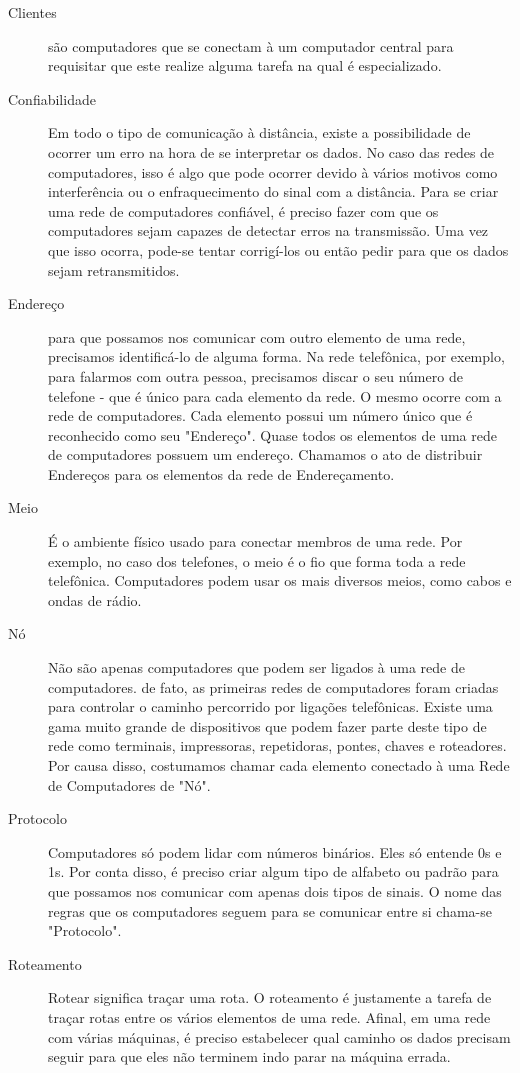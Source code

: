 	\begin{description}
		\item[Clientes] são computadores que se conectam à um computador central para requisitar que este realize alguma tarefa na qual é especializado.
		\item[Confiabilidade] Em todo o tipo de comunicação à distância, existe a possibilidade de ocorrer um erro na hora de se interpretar os dados. No caso das redes de computadores, isso é algo que pode ocorrer devido à vários motivos como interferência ou o enfraquecimento do sinal com a distância. Para se criar uma rede de computadores confiável, é preciso fazer com que os computadores sejam capazes de detectar erros na transmissão. Uma vez que isso ocorra, pode-se tentar corrigí-los ou então pedir para que os dados sejam retransmitidos.
		\item[Endereço] para que possamos nos comunicar com outro elemento de uma rede, precisamos identificá-lo de alguma forma. Na rede telefônica, por exemplo, para falarmos com outra pessoa, precisamos discar o seu número de telefone - que é único para cada elemento da rede. O mesmo ocorre com a rede de computadores. Cada elemento possui um número único que é reconhecido como seu "Endereço". Quase todos os elementos de uma rede de computadores possuem um endereço. Chamamos o ato de distribuir Endereços para os elementos da rede de Endereçamento.
		\item[Meio] É o ambiente físico usado para conectar membros de uma rede. Por exemplo, no caso dos telefones, o meio é o fio que forma toda a rede telefônica. Computadores podem usar os mais diversos meios, como cabos e ondas de rádio.
		\item[Nó] Não são apenas computadores que podem ser ligados à uma rede de computadores. de fato, as primeiras redes de computadores foram criadas para controlar o caminho percorrido por ligações telefônicas. Existe uma gama muito grande de dispositivos que podem fazer parte deste tipo de rede como terminais, impressoras, repetidoras, pontes, chaves e roteadores. Por causa disso, costumamos chamar cada elemento conectado à uma Rede de Computadores de "Nó".
		\item[Protocolo] Computadores só podem lidar com números binários. Eles só entende 0s e 1s. Por conta disso, é preciso criar algum tipo de alfabeto ou padrão para que possamos nos comunicar com apenas dois tipos de sinais. O nome das regras que os computadores seguem para se comunicar entre si chama-se "Protocolo".
		\item[Roteamento] Rotear significa traçar uma rota. O roteamento é justamente a tarefa de traçar rotas entre os vários elementos de uma rede. Afinal, em uma rede com várias máquinas, é preciso estabelecer qual caminho os dados precisam seguir para que eles não terminem indo parar na máquina errada.

\end{description}
